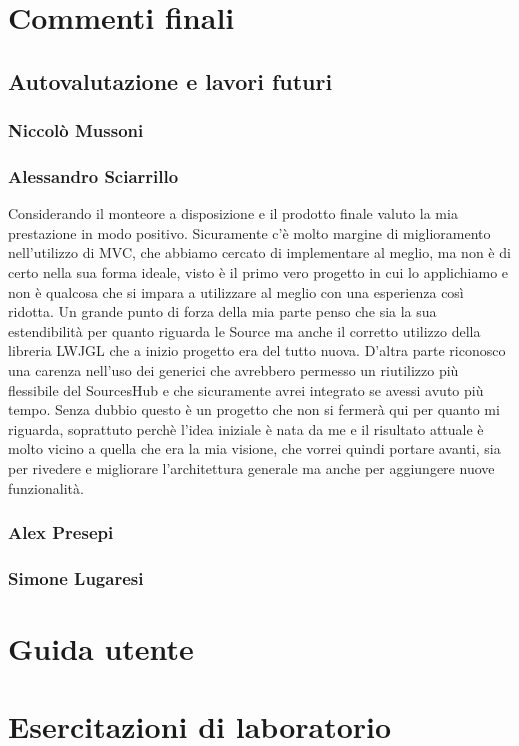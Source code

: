 \documentclass[a4paper,12pt]{report}
\begin{document}
\chapter{Commenti finali}
\section{Autovalutazione e lavori futuri}
\subsection*{Niccolò Mussoni}
\subsection*{Alessandro Sciarrillo}
Considerando il monteore a disposizione e il prodotto finale valuto la mia prestazione in modo positivo.
Sicuramente c'è molto margine di miglioramento nell'utilizzo di MVC, che abbiamo cercato di implementare al meglio, ma non è di certo nella sua forma ideale, visto è il primo vero progetto in cui lo applichiamo e non è qualcosa che si impara a utilizzare al meglio con una esperienza così ridotta. Un grande punto di forza della mia parte penso che sia la sua estendibilità per quanto riguarda le Source ma anche il corretto utilizzo della libreria LWJGL che a inizio progetto era del tutto nuova. D'altra parte riconosco una carenza nell'uso dei generici che avrebbero permesso un riutilizzo più flessibile del SourcesHub e che sicuramente avrei integrato se avessi avuto più tempo.
Senza dubbio questo è un progetto che non si fermerà qui per quanto mi riguarda, soprattuto perchè l'idea iniziale è nata da me e il risultato attuale è molto vicino a quella che era la mia visione, che vorrei quindi portare avanti, sia per rivedere e migliorare l'architettura generale ma anche per aggiungere nuove funzionalità.
\subsection*{Alex Presepi}
\subsection*{Simone Lugaresi}

\appendix
\chapter{Guida utente}

\chapter{Esercitazioni di laboratorio}
\end{document}
